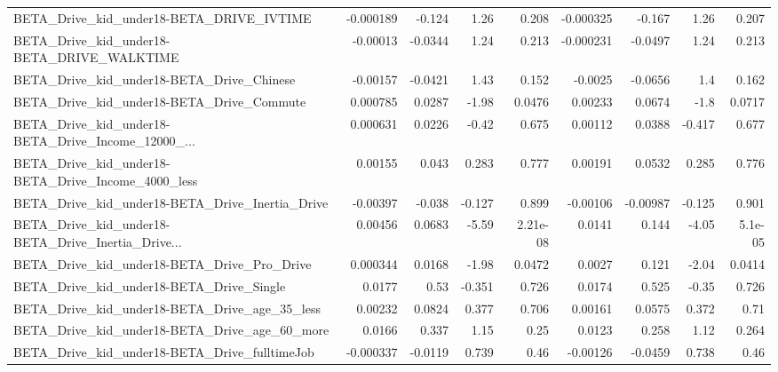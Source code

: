 \begin{tabular}{lrrrrrrrr}
BETA\_Drive\_kid\_under18-BETA\_DRIVE\_IVTIME           &   -0.000189 &       -0.124 &     1.26 &    0.208 &  -0.000325 &      -0.167 &         1.26 &         0.207 \\
BETA\_Drive\_kid\_under18-BETA\_DRIVE\_WALKTIME         &    -0.00013 &      -0.0344 &     1.24 &    0.213 &  -0.000231 &     -0.0497 &         1.24 &         0.213 \\
BETA\_Drive\_kid\_under18-BETA\_Drive\_Chinese          &    -0.00157 &      -0.0421 &     1.43 &    0.152 &    -0.0025 &     -0.0656 &          1.4 &         0.162 \\
BETA\_Drive\_kid\_under18-BETA\_Drive\_Commute          &    0.000785 &       0.0287 &    -1.98 &   0.0476 &    0.00233 &      0.0674 &         -1.8 &        0.0717 \\
BETA\_Drive\_kid\_under18-BETA\_Drive\_Income\_12000\_... &    0.000631 &       0.0226 &    -0.42 &    0.675 &    0.00112 &      0.0388 &       -0.417 &         0.677 \\
BETA\_Drive\_kid\_under18-BETA\_Drive\_Income\_4000\_less &     0.00155 &        0.043 &    0.283 &    0.777 &    0.00191 &      0.0532 &        0.285 &         0.776 \\
BETA\_Drive\_kid\_under18-BETA\_Drive\_Inertia\_Drive    &    -0.00397 &       -0.038 &   -0.127 &    0.899 &   -0.00106 &    -0.00987 &       -0.125 &         0.901 \\
BETA\_Drive\_kid\_under18-BETA\_Drive\_Inertia\_Drive... &     0.00456 &       0.0683 &    -5.59 & 2.21e-08 &     0.0141 &       0.144 &        -4.05 &       5.1e-05 \\
BETA\_Drive\_kid\_under18-BETA\_Drive\_Pro\_Drive        &    0.000344 &       0.0168 &    -1.98 &   0.0472 &     0.0027 &       0.121 &        -2.04 &        0.0414 \\
BETA\_Drive\_kid\_under18-BETA\_Drive\_Single           &      0.0177 &         0.53 &   -0.351 &    0.726 &     0.0174 &       0.525 &        -0.35 &         0.726 \\
BETA\_Drive\_kid\_under18-BETA\_Drive\_age\_35\_less      &     0.00232 &       0.0824 &    0.377 &    0.706 &    0.00161 &      0.0575 &        0.372 &          0.71 \\
BETA\_Drive\_kid\_under18-BETA\_Drive\_age\_60\_more      &      0.0166 &        0.337 &     1.15 &     0.25 &     0.0123 &       0.258 &         1.12 &         0.264 \\
BETA\_Drive\_kid\_under18-BETA\_Drive\_fulltimeJob      &   -0.000337 &      -0.0119 &    0.739 &     0.46 &   -0.00126 &     -0.0459 &        0.738 &          0.46 \\

\end{tabular}
